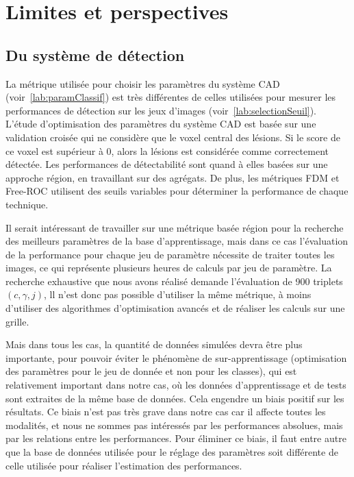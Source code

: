 \section{Limites et perspectives}


\subsection{Du système de détection}

La métrique utilisée pour choisir les paramètres du système CAD
(voir~\ref{lab:paramClassif}) est très différentes de celles utilisées pour
mesurer les performances de détection sur les jeux d'images
(voir~\ref{lab:selectionSeuil}). L'étude d'optimisation des paramètres du
système CAD est basée sur une validation croisée qui ne considère que le
voxel central des lésions. Si le score de ce voxel est supérieur à 0,
alors la lésions est considérée comme correctement détectée. Les
performances de détectabilité sont quand à elles basées sur une approche
région, en travaillant sur des agrégats. De plus, les métriques FDM et
Free-ROC utilisent des seuils variables pour déterminer la performance de chaque
technique. 

Il serait intéressant de travailler sur une métrique basée région pour la
recherche des meilleurs paramètres de la base d'apprentissage, mais dans ce cas
l'évaluation de la performance pour chaque jeu de paramètre nécessite de traiter
toutes les images, ce qui représente plusieurs heures de calculs par jeu de
paramètre. La recherche exhaustive que nous avons réalisé demande l'évaluation
de 900 triplets $(c, \gamma, j)$, ll n'est donc pas possible d'utiliser la même
métrique, à moins d'utiliser des algorithmes d'optimisation avancés et de
réaliser les calculs sur une grille. 


Mais dans tous les cas, la quantité de données simulées devra être plus
importante, pour pouvoir éviter le phénomène de sur-apprentissage (optimisation
des paramètres pour le jeu de donnée et non pour les classes), qui est
relativement important dans notre cas, où les données d'apprentissage et
de tests sont extraites de la même base de données. Cela engendre un biais
positif sur les résultats. Ce biais n'est pas très grave dans notre cas car
il affecte toutes les modalités, et nous ne sommes pas intéressés par les
performances absolues, mais par les relations entre les performances.
Pour éliminer ce biais, il faut entre autre que la base de données utilisée
pour le réglage des paramètres soit différente de celle utilisée pour réaliser
l'estimation des performances.

